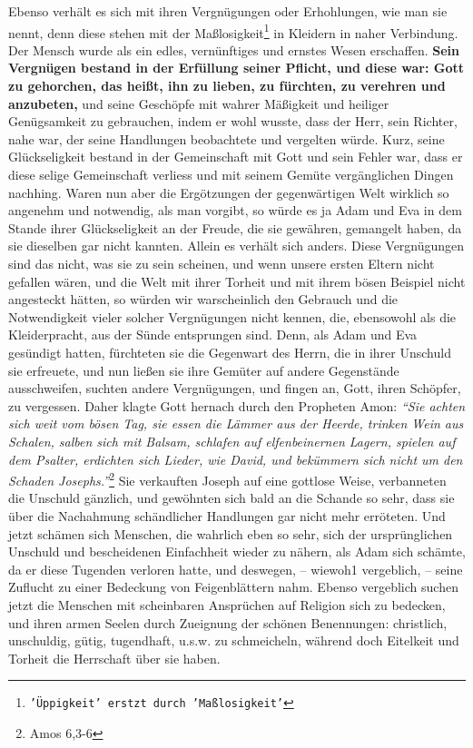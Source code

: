 Ebenso verhält es sich mit ihren Vergnügungen oder Erhohlungen,
wie man sie
nennt, denn diese stehen mit der
Maßlosigkeit\footnote{\texttt{'Üppigkeit' erstzt durch 'Maßlosigkeit'}} in
Kleidern in naher
Verbindung. Der
Mensch wurde als ein edles, vernünftiges und ernstes Wesen erschaffen.
\textbf{Sein
Vergnügen bestand in der Erfüllung seiner Pflicht, und diese war: Gott zu
gehorchen, das heißt, ihn zu lieben, zu fürchten, zu verehren und anzubeten,}
und
seine Geschöpfe mit wahrer Mäßigkeit und heiliger Genügsamkeit zu gebrauchen,
indem er wohl wusste, dass der Herr, sein Richter, nahe war, der seine
Handlungen
beobachtete und vergelten würde. Kurz, seine Glückseligkeit bestand in der
Gemeinschaft mit Gott und sein Fehler war, dass er diese selige Gemeinschaft
verliess und mit seinem Gemüte vergänglichen Dingen nachhing. Waren nun aber
die Ergötzungen der gegenwärtigen Welt wirklich so angenehm und notwendig, als
man vorgibt, so würde es ja Adam und Eva in dem Stande ihrer Glückseligkeit an
der Freude, die sie gewähren, gemangelt haben, da sie dieselben gar nicht
kannten. Allein es verhält sich anders. Diese Vergnügungen sind das nicht, was
sie zu sein scheinen, und wenn unsere ersten Eltern nicht gefallen wären, und
die Welt mit ihrer Torheit und mit ihrem bösen Beispiel nicht angesteckt
hätten, so würden wir warscheinlich den Gebrauch und die Notwendigkeit vieler
solcher Vergnügungen nicht kennen, die, ebensowohl als die Kleiderpracht, aus
der Sünde entsprungen sind.  Denn, als Adam und Eva gesündigt
hatten, fürchteten
sie die Gegenwart des Herrn, die in ihrer Unschuld sie erfreuete, und nun ließen
sie ihre Gemüter auf andere Gegenstände ausschweifen, suchten andere
Vergnügungen, und fingen an, Gott, ihren Schöpfer, zu vergessen. Daher klagte
Gott hernach durch den Propheten Amon:
\textit{"`Sie achten sich weit vom bösen Tag,
sie essen die Lämmer aus der Heerde, trinken Wein aus Schalen, salben sich mit
Balsam, schlafen auf elfenbeinernen Lagern, spielen auf dem Psalter, erdichten
sich Lieder, wie David, und bekümmern sich nicht um den Schaden
Josephs."'}\footnote{Amos 6,3-6}
Sie verkauften Joseph auf eine gottlose
Weise, verbanneten die Unschuld gänzlich, und gewöhnten sich bald an die Schande
so sehr, dass sie über die Nachahmung schändlicher Handlungen gar nicht mehr
erröteten. Und jetzt schämen sich Menschen, die wahrlich eben so sehr, sich der
ursprünglichen Unschuld und bescheidenen Einfachheit wieder zu nähern, als Adam
sich schämte, da er diese Tugenden verloren hatte, und deswegen, -- wiewoh1
vergeblich, -- seine Zuflucht zu einer Bedeckung von Feigenblättern nahm. Ebenso
vergeblich suchen jetzt die Menschen mit scheinbaren Ansprüchen auf Religion
sich zu bedecken, und ihren armen Seelen durch Zueignung der schönen
Benennungen: christlich, unschuldig, gütig, tugendhaft, u.s.w. zu schmeicheln,
während doch Eitelkeit und Torheit die Herrschaft über sie haben.

